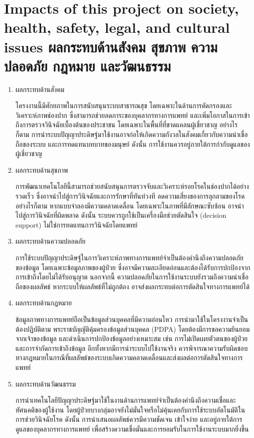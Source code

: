 \section{\ifenglish%
Impacts of this project on society, health, safety, legal, and cultural issues
\else%
ผลกระทบด้านสังคม สุขภาพ ความปลอดภัย กฎหมาย และวัฒนธรรม
\fi}
\begin{enumerate}
    \item ผลกระทบด้านสังคม

    โครงงานนี้มีศักยภาพในการสนับสนุนระบบสาธารณสุข โดยเฉพาะในด้านการคัดกรองและวิเคราะห์ภาพช่องปาก ซึ่งสามารถช่วยลดภาระของบุคลากรทางการแพทย์ และเพิ่มโอกาสในการเข้าถึงการตรวจวินิจฉัยเบื้องต้นของประชาชน โดยเฉพาะในพื้นที่ที่ขาดแคลนผู้เชี่ยวชาญ \newline
    อย่างไรก็ตาม การนำระบบปัญญาประดิษฐ์มาใช้งานอาจก่อให้เกิดความกังวลในสังคมเกี่ยวกับความน่าเชื่อถือของระบบ และการทดแทนบทบาทของมนุษย์ ดังนั้น การใช้งานควรอยู่ภายใต้การกำกับดูแลของผู้เชี่ยวชาญ
    \item ผลกระทบด้านสุขภาพ

    การพัฒนาเทคโนโลยีนี้สามารถช่วยสนับสนุนการตรวจจับและวิเคราะห์รอยโรคในช่องปากได้อย่างรวดเร็ว ซึ่งอาจนำไปสู่การวินิจฉัยและการรักษาที่ทันท่วงที ลดความเสี่ยงของการลุกลามของโรค \newline
    อย่างไรก็ตาม หากแบบจำลองมีความคลาดเคลื่อน โดยเฉพาะในภาพที่มีลักษณะซับซ้อน อาจนำไปสู่การวินิจฉัยที่ผิดพลาด ดังนั้น ระบบควรถูกใช้เป็นเครื่องมือช่วยตัดสินใจ (decision support) ไม่ใช่การทดแทนการวินิจฉัยโดยแพทย์
    \item ผลกระทบด้านความปลอดภัย

    การใช้ระบบปัญญาประดิษฐ์ในการวิเคราะห์ภาพทางการแพทย์จำเป็นต้องคำนึงถึงความปลอดภัยของข้อมูล โดยเฉพาะข้อมูลภาพของผู้ป่วย ซึ่งอาจมีความละเอียดอ่อนและต้องได้รับการปกป้องจากการเข้าถึงโดยไม่ได้รับอนุญาต \newline
    นอกจากนี้ ความปลอดภัยในการใช้งานระบบยังรวมถึงความน่าเชื่อถือของผลลัพธ์ หากระบบให้ผลลัพธ์ที่ไม่ถูกต้อง อาจส่งผลกระทบต่อการตัดสินใจทางการแพทย์ได้
    \item ผลกระทบด้านกฎหมาย
    
    ข้อมูลภาพทางการแพทย์ถือเป็นข้อมูลส่วนบุคคลที่มีความอ่อนไหว การนำมาใช้ในโครงงานจำเป็นต้องปฏิบัติตาม พระราชบัญญัติคุ้มครองข้อมูลส่วนบุคคล (PDPA) โดยต้องมีการขอความยินยอมจากเจ้าของข้อมูล และดำเนินการปกป้องข้อมูลอย่างเหมาะสม เช่น การไม่เปิดเผยตัวตนของผู้ป่วยและการจำกัดการเข้าถึงข้อมูล \newline
    อีกทั้งหากมีการนำระบบไปใช้งานจริง ควรพิจารณาความรับผิดชอบทางกฎหมายในกรณีที่ผลลัพธ์ของระบบเกิดความคลาดเคลื่อนและส่งผลต่อการตัดสินใจทางการแพทย์
    \item ผลกระทบด้านวัฒนธรรม
    
    การนำเทคโนโลยีปัญญาประดิษฐ์มาใช้ในงานด้านการแพทย์จำเป็นต้องคำนึงถึงความเชื่อและทัศนคติของผู้ใช้งาน โดยผู้ป่วยบางกลุ่มอาจยังไม่มั่นใจหรือไม่คุ้นเคยกับการใช้ระบบอัตโนมัติในการช่วยวินิจฉัยโรค ดังนั้น การนำเสนอผลลัพธ์ควรมีความชัดเจน เข้าใจง่าย และอยู่ภายใต้การดูแลของบุคลากรทางการแพทย์ เพื่อสร้างความเชื่อมั่นและการยอมรับในการใช้งานระบบมากยิ่งขึ้น
\end{enumerate}